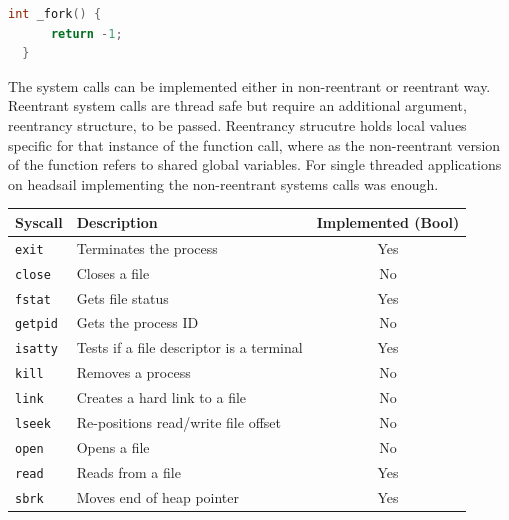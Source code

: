 \documentclass[12pt,a4paper,english
]{tunithesis}
\begin{document}
\begin{lstlisting}[language=C, caption={Minimal implmentation of the fork() syscall in Newlib Libgloss}]
  int _fork() {
      return -1;
  }
\end{lstlisting}

The system calls can be implemented either in non-reentrant or reentrant way. Reentrant system calls are thread safe but require an additional argument, reentrancy structure, to be passed. Reentrancy strucutre holds local values specific for that instance of the function call, where as the non-reentrant version of the function refers to shared global variables. For single threaded applications on headsail implementing the non-reentrant systems calls was enough.~\parencite{bennett2010porting}


\begin{table}[htbp]
\centering
\begin{tabular}{|l|l|c|}
\hline
\textbf{Syscall}       & \textbf{Description}               & \textbf{Implemented (Bool)} \\ \hline
\texttt{exit}         & Terminates the process             & Yes                       \\ \hline
\texttt{close}         & Closes a file                      & No                       \\ \hline
\texttt{fstat}         & Gets file status                   & Yes                       \\ \hline
\texttt{getpid}        & Gets the process ID                & No                       \\ \hline
\texttt{isatty}        & Tests if a file descriptor is a terminal & Yes                 \\ \hline
\texttt{kill}          & Removes a process                    & No                       \\ \hline
\texttt{link}          & Creates a hard link to a file      & No                       \\ \hline
\texttt{lseek}         & Re-positions read/write file offset & No                       \\ \hline
\texttt{open}          & Opens a file                       & No                       \\ \hline
\texttt{read}          & Reads from a file                  & Yes                       \\ \hline
\texttt{sbrk}          & Moves end of heap pointer          & Yes                       \\ \hline

\end{tabular}
\end{table}
\end{document}
